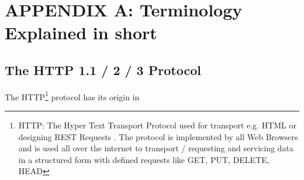 \documentclass[10pt,a4paper,english]{article}
\begin{document}
\section{APPENDIX A: Terminology Explained in short}
\subsection{The HTTP 1.1 / 2 / 3 Protocol}
\begin{flushleft}
The HTTP\footnote{HTTP:  The Hyper Text Transport Protocol used for transport  e.g. HTML or designing REST Requests . The protocol is implemented by all Web Browsers and is used all over the internet to transport / requesting and servicing data in a structured form with defined requests like GET, PUT, DELETE, HEAD} protocol has its origin in 
\end{flushleft}
\end{document}
